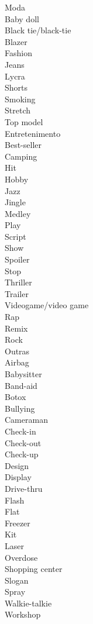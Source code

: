 \documentclass[12pt,a4paper]{article} %
\begin{document}
Moda\\

Baby doll\\
Black tie/black-tie\\
Blazer\\
Fashion\\
Jeans\\
Lycra\\
Shorts\\
Smoking\\
Stretch\\
Top model\\

Entretenimento\\

Best-seller\\
Camping\\
Hit\\
Hobby\\
Jazz\\
Jingle\\
Medley\\
Play\\
Script\\
Show\\
Spoiler\\
Stop\\
Thriller\\
Trailer\\
Videogame/video game\\
Rap\\
Remix\\
Rock\\

Outras\\

Airbag\\
Babysitter\\
Band-aid\\
Botox\\
Bullying\\
Cameraman\\
Check-in\\
Check-out\\
Check-up\\
Design\\
Display\\
Drive-thru\\
Flash\\
Flat\\
Freezer\\
Kit\\
Laser\\
Overdose\\
Shopping center\\
Slogan\\
Spray\\
Walkie-talkie\\
Workshop\\
\end{document}
